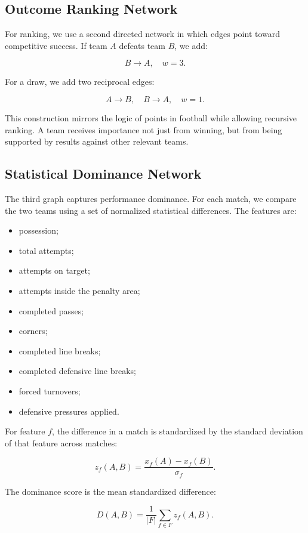 \documentclass[10pt,twocolumn]{article}
\begin{document}
\subsection{Outcome Ranking Network}

For ranking, we use a second directed network in which edges point toward competitive success. If team $A$ defeats team $B$, we add:

\[
    B \rightarrow A, \quad w = 3.
\]

For a draw, we add two reciprocal edges:

\[
    A \rightarrow B, \quad B \rightarrow A, \quad w = 1.
\]

This construction mirrors the logic of points in football while allowing recursive ranking. A team receives importance not just from winning, but from being supported by results against other relevant teams.

\subsection{Statistical Dominance Network}

The third graph captures performance dominance. For each match, we compare the two teams using a set of normalized statistical differences. The features are:

\begin{itemize}
    \item possession;
    \item total attempts;
    \item attempts on target;
    \item attempts inside the penalty area;
    \item completed passes;
    \item corners;
    \item completed line breaks;
    \item completed defensive line breaks;
    \item forced turnovers;
    \item defensive pressures applied.
\end{itemize}

For feature $f$, the difference in a match is standardized by the standard deviation of that feature across matches:

\[
    z_f(A,B) = \frac{x_f(A) - x_f(B)}{\sigma_f}.
\]

The dominance score is the mean standardized difference:

\[
    D(A,B) = \frac{1}{|F|}\sum_{f \in F} z_f(A,B).
\]
\end{document}
